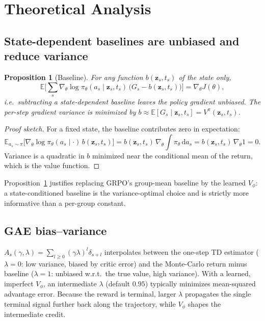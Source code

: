 \documentclass[11pt]{article}
\theoremstyle{plain}
\newtheorem{proposition}{Proposition}
\theoremstyle{remark}
\newcommand{\zt}{\bm{z}}
\newcommand{\E}{\mathbb{E}}
\begin{document}
\section{Theoretical Analysis}
\label{sec:theory}

\subsection{State-dependent baselines are unbiased and reduce variance}

\begin{proposition}[Baseline]
\label{prop:baseline}
For any function $b(\zt_s,t_s)$ of the state only,
\[
\E\!\Big[\textstyle\sum_s \nabla_\theta \log\pi_\theta(a_s\mid \zt_s,t_s)\,\big(G_s - b(\zt_s,t_s)\big)\Big]
= \nabla_\theta J(\theta),
\]
i.e.\ subtracting a state-dependent baseline leaves the policy gradient unbiased.
The per-step gradient variance is minimized by $b \approx \E[G_s\mid \zt_s,t_s] = V^{\pi}(\zt_s,t_s)$.
\end{proposition}

\begin{proof}[Proof sketch]
For a fixed state, the baseline contributes zero in expectation:
\[
\E_{a_s\sim\pi}\!\big[\nabla_\theta\log\pi_\theta(a_s\mid\cdot)\,b(\zt_s,t_s)\big]
= b(\zt_s,t_s)\,\nabla_\theta\!\int \pi_\theta\, \mathrm{d}a_s
= b(\zt_s,t_s)\,\nabla_\theta 1 = 0.
\]
Variance is a quadratic in $b$ minimized near the conditional mean of the return,
which is the value function.
\end{proof}

Proposition~\ref{prop:baseline} justifies replacing GRPO's group-mean baseline by the
learned $V_\phi$: a state-conditioned baseline is the variance-optimal choice and is
strictly more informative than a per-group constant.

\subsection{GAE bias--variance}
$A_s(\gamma,\lambda)=\sum_{l\ge0}(\gamma\lambda)^l\delta_{s+l}$ interpolates between
the one-step TD estimator ($\lambda{=}0$: low variance, biased by critic error) and
the Monte-Carlo return minus baseline ($\lambda{=}1$: unbiased w.r.t.\ the true value,
high variance). With a learned, imperfect $V_\phi$, an intermediate $\lambda$
(default $0.95$) typically minimizes mean-squared advantage error. Because the reward
is terminal, larger $\lambda$ propagates the single terminal signal further back along
the trajectory, while $V_\phi$ shapes the intermediate credit.
\end{document}

